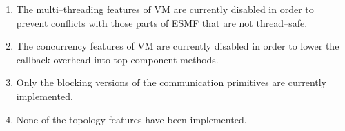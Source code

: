 

\begin{enumerate}

\item The multi--threading features of VM are currently disabled in order to prevent conflicts with those parts of ESMF that are not thread--safe.

\item The concurrency features of VM are currently disabled in order to lower the callback overhead into top component methods. 

\item Only the blocking versions of the communication primitives are currently implemented.

\item None of the topology features have been implemented.

\end{enumerate}


